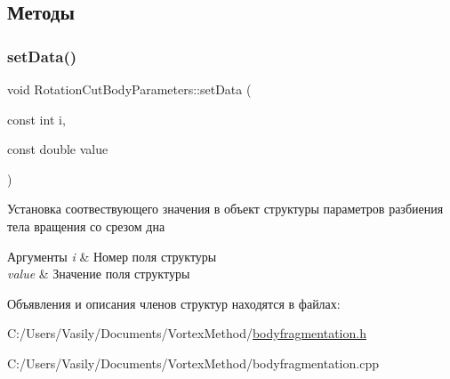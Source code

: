 \subsection{Методы}
\mbox{\label{struct_rotation_cut_body_parameters_a8f8166704d1f04e836ad98145ce79581}} 
\subsubsection{\texorpdfstring{set\+Data()}{setData()}}
{\footnotesize\ttfamily void Rotation\+Cut\+Body\+Parameters\+::set\+Data (\begin{DoxyParamCaption}\item[{const int}]{i,  }\item[{const double}]{value }\end{DoxyParamCaption})}

Установка соотвествующего значения в объект структуры параметров разбиения тела вращения со срезом дна 
\begin{DoxyParams}{Аргументы}
{\em i} & Номер поля структуры \\
\hline
{\em value} & Значение поля структуры \\
\hline
\end{DoxyParams}


Объявления и описания членов структур находятся в файлах\+:\begin{DoxyCompactItemize}
\item 
C\+:/\+Users/\+Vasily/\+Documents/\+Vortex\+Method/\mbox{\hyperlink{bodyfragmentation_8h}{bodyfragmentation.\+h}}\item 
C\+:/\+Users/\+Vasily/\+Documents/\+Vortex\+Method/bodyfragmentation.\+cpp\end{DoxyCompactItemize}
